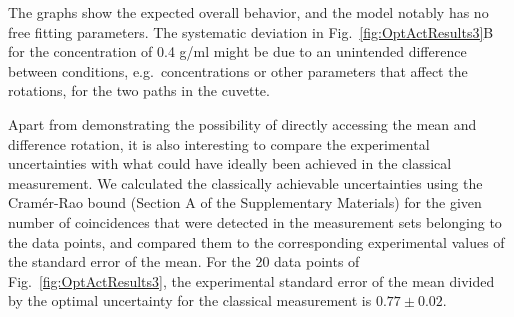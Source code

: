 \documentclass[12pt,preprint]{revtex4}
\begin{document}

The graphs show the expected overall behavior, and the model notably has no free fitting parameters. The systematic deviation in Fig.\ \ref{fig:OptActResults3}B for the concentration of 0.4 g/ml might be due to an unintended difference between conditions, e.g.\ concentrations or other parameters that affect the rotations, for the two paths in the cuvette.

Apart from demonstrating the possibility of directly accessing the mean and difference rotation, it is also interesting to compare the experimental uncertainties with what could have ideally been achieved in the classical measurement. We calculated the classically achievable uncertainties using the Cram\'{e}r-Rao bound (Section A of the Supplementary Materials) for the given number of coincidences that were detected in the measurement sets belonging to the data points, and compared them to the corresponding experimental values of the standard error of the mean. For the 20 data points of Fig.\ \ref{fig:OptActResults3}, the experimental standard error of the mean divided by the optimal uncertainty for the classical measurement is $0.77\pm 0.02$. 
\end{document}
